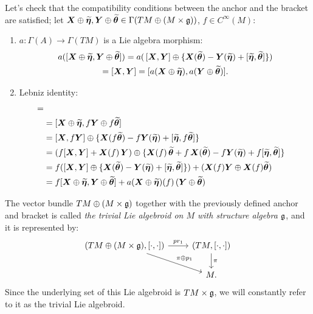 Let's check that the compatibility conditions between the anchor and the bracket are satisfied; let $\bm{X} \oplus \widetilde{\bm{\eta}}, \bm{Y} \oplus \widetilde{\bm{\theta}} \in \Gamma(TM \oplus (M \times \mathfrak{g}))$, $f \in C^\infty(M)$:

    \begin{enumerate}
    \item $a: \Gamma(A) \to \Gamma(TM)$ is a Lie algebra morphism: 
    \begin{multline*}
    a([\bm{X} \oplus \widetilde{\bm{\eta}}, \bm{Y} \oplus \widetilde{\bm{\theta}}]) 
    = a(\, [\bm{X}, \bm{Y}] \oplus \{\bm{X}(\widetilde{\bm{\theta}}) - \bm{Y}(\widetilde{\bm{\eta}}) + [\widetilde{\bm{\eta}}, \widetilde{\bm{\theta}}]  \}) \\
    = [\bm{X}, \bm{Y}] 
    = [a(\bm{X} \oplus \widetilde{\bm{\eta}}), a(\bm{Y} \oplus \widetilde{\bm{\theta}})].    
    \end{multline*}
    
    
    \item Lebniz identity: 
    \begin{align*}
        [\sect X \oplus \stilde \eta, &f\, (\sect Y \oplus \stilde \theta)] =\\
        &= [\sect X \oplus \stilde \eta, f\sect Y \oplus f\stilde \theta] \\
        &=  [\sect X, f\sect Y] \oplus \{\sect X(f\stilde \theta) - f\sect Y(\stilde \eta) + [\stilde \eta, f\stilde \theta]\} \\
        &= (f[\sect X, \sect Y] + \sect X(f)\,\sect Y) \oplus \{\sect X(f)\,\stilde \theta + f\,\sect X(\stilde \theta) - f\sect Y(\stilde \eta) + f[\stilde \eta, \stilde \theta]\} \\
        &=f([\sect X, \sect Y] \oplus \{ \sect X(\stilde \theta) -\sect Y(\stilde \eta) + [\stilde \eta, \stilde \theta]\} ) + (\sect X(f) \sect Y \oplus \sect X(f)\stilde \theta) \\
        &= f[\sect X \oplus \stilde \eta, \sect Y \oplus \stilde \theta] + a(\sect X \oplus \stilde \eta)(f) \, (\sect Y \oplus \stilde \theta)
    \end{align*}
    \end{enumerate}

The vector bundle $TM \oplus (M \times \mathfrak{g})$ together with the previously defined anchor and bracket is called \emph{the trivial Lie algebroid on $M$ with structure algebra $\mathfrak{g}$}, and it is represented by:
\begin{equation}
    \begin{tikzcd}
    (TM \oplus (M \times \alg g), [\cdot, \cdot]) \arrow{r}{pr_1} \arrow{dr}{\pi \oplus p_1} & (TM, [\cdot, \cdot]) \arrow{d}{\pi}\\
    & M.
    \end{tikzcd}
\end{equation}
Since the underlying set of this Lie algebroid is $TM \times \mathfrak{g}$, we will constantly refer to it as the trivial Lie algebroid.

